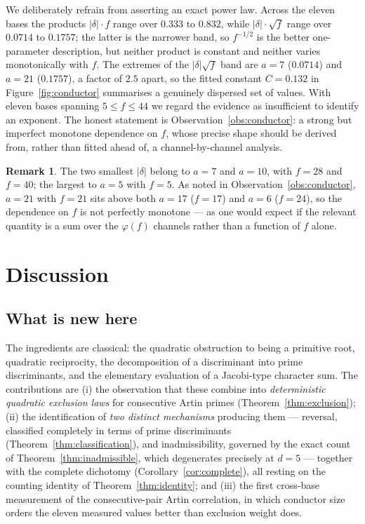 \documentclass[11pt,reqno]{amsart}
\theoremstyle{plain}
\theoremstyle{definition}
\newtheorem{remark}[theorem]{Remark}
\begin{document}
We deliberately refrain from asserting an exact power law. Across the eleven
bases the products $|\delta| \cdot f$ range over $0.333$ to $0.832$, while
$|\delta| \cdot \sqrt{f}$ range over $0.0714$ to $0.1757$; the latter is the
narrower band, so $f^{-1/2}$ is the better one-parameter description, but
neither product is constant and neither varies monotonically with $f$. The
extremes of the $|\delta|\sqrt{f}$ band are $a = 7$ ($0.0714$) and $a = 21$
($0.1757$), a factor of $2.5$ apart, so the fitted constant $C = 0.132$ in
Figure~\ref{fig:conductor} summarises a genuinely dispersed set of values.
With eleven bases spanning $5 \le f \le 44$ we regard the evidence as
insufficient to identify an exponent. The honest statement is
Observation~\ref{obs:conductor}: a strong but imperfect monotone dependence on
$f$, whose precise shape should be derived from, rather than fitted ahead of,
a channel-by-channel analysis.

\begin{remark}
The two smallest $|\delta|$ belong to $a = 7$ and $a = 10$, with $f = 28$ and
$f = 40$; the largest to $a = 5$ with $f = 5$. As noted in
Observation~\ref{obs:conductor}, $a = 21$ with $f = 21$ sits above both
$a = 17$ ($f = 17$) and $a = 6$ ($f = 24$), so the dependence on $f$ is not
perfectly monotone --- as one would expect if the relevant quantity is a sum
over the $\varphi(f)$ channels rather than a function of $f$ alone.
\end{remark}

\section{Discussion}
\label{sec:discussion}

\subsection*{What is new here}
The ingredients are classical: the quadratic obstruction to being a primitive
root, quadratic reciprocity, the decomposition of a discriminant into prime
discriminants, and the elementary evaluation of a Jacobi-type character sum. The
contributions are (i) the observation that these combine into
\emph{deterministic quadratic exclusion laws} for consecutive Artin primes
(Theorem~\ref{thm:exclusion}); (ii) the identification of \emph{two distinct
mechanisms} producing them --- reversal, classified completely in terms of prime
discriminants (Theorem~\ref{thm:classification}), and inadmissibility,
governed by the exact count of Theorem~\ref{thm:inadmissible}, which
degenerates precisely at $d = 5$ --- together with the complete dichotomy
(Corollary~\ref{cor:complete}), all resting on the counting identity of
Theorem~\ref{thm:identity}; and (iii) the first cross-base measurement of
the consecutive-pair Artin correlation, in which conductor size orders the eleven measured values better than
exclusion weight does.
\end{document}
